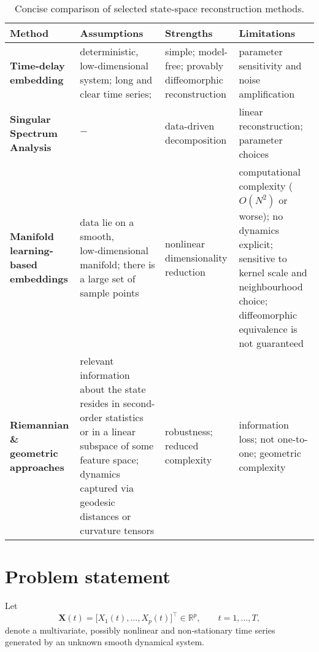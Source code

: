 \documentclass[14pt]{extarticle}
\begin{document}
	\begin{table}[bhtp]
		\centering
		\renewcommand{\arraystretch}{1.25} %
		\begin{tabularx}{\textwidth}{
				>{\raggedright\arraybackslash}p{3.3cm}   %
				>{\raggedright\arraybackslash}X           %
				>{\raggedright\arraybackslash}X           %
				>{\raggedright\arraybackslash}X}          %
			\toprule
			\textbf{Method} & \textbf{Assumptions} & \textbf{Strengths} & \textbf{Limitations} \\
			\midrule
			\textbf{Time-delay embedding} &
			deterministic, low-dimensional system; long and clear time series;  &
			simple; model-free; provably diffeomorphic reconstruction &
			parameter sensitivity and noise amplification \\[0.3em] \hline
			
			\textbf{Singular Spectrum Analysis} &
			$-$ &
			data-driven decomposition &
			linear reconstruction; parameter choices \\[0.3em] \hline
			
			\textbf{Manifold learning-based embeddings} &
			data lie on a smooth, low‑dimensional manifold; there is a large set of sample points &
			nonlinear dimensionality reduction &
			computational complexity ($O(N^2)$ or worse); no dynamics explicit; sensitive to kernel scale and neighbourhood choice; diffeomorphic equivalence is not guaranteed \\[0.3em] \hline
			
			\textbf{Riemannian \& geometric approaches} &
			relevant information about the state resides in second-order statistics or in a linear subspace of some feature space; dynamics captured via geodesic distances or curvature tensors &
			robustness; reduced complexity &
			information loss; not one-to-one; geometric complexity \\
			\bottomrule
		\end{tabularx}
		\caption{Concise comparison of selected state‑space reconstruction methods.}
		\label{tab:ssr_selected}
	\end{table}
	
	\section{Problem statement}
	
	Let
	\[
	\mathbf X(t)=\bigl[X_{1}(t),\dots ,X_{p}(t)\bigr]^{\!\top}\in\mathbb R^{p},
	\qquad t=1,\dots ,T ,
	\]
	denote a multivariate, possibly nonlinear and non‑stationary time series
	generated by an unknown smooth dynamical system.
	
\end{document}
